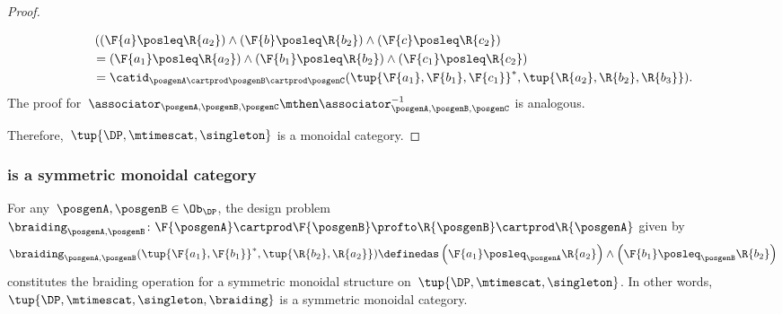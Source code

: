 \begin{proof}
\begin{compactitem}
\begin{equation}
\begin{aligned}
                & \left((\F{a}\posleq \R{a_2})\wedge (\F{b}\posleq \R{b_2}) \wedge (\F{c}\posleq \R{c_2}\right)\\
                &=(\F{a_1}\posleq \R{a_2}) \wedge (\F{b_1}\posleq \R{b_2}) \wedge (\F{c_1}\posleq \R{c_2})\\
                &=\catid_{\posgenA\cartprod \posgenB\cartprod \posgenC}(\tup{\F{a_1},\F{b_1},\F{c_1}}^*,\tup{\R{a_2},\R{b_2},\R{b_3}}).
            \end{aligned}
        \end{equation}
        The proof for~$\associator_{\posgenA,\posgenB,\posgenC}\mthen \associator_{\posgenA,\posgenB,\posgenC}^{-1}$ is analogous.
    \end{compactitem}
    Therefore,~$\tup{\DP,\mtimescat, \singleton}$ is a monoidal category.
\end{proof}

\subsubsection*{\DP is a symmetric monoidal category}
\begin{lemma}
    \label{lem:symmetricmonoidaldp}
    For any~$\posgenA,\posgenB \in\Ob_\DP$, the design problem~$\braiding_{\posgenA,\posgenB}\colon \F{\posgenA} \cartprod \F{\posgenB} \profto \R{\posgenB} \cartprod \R{\posgenA}$ given by
    \begin{equation}
        \braiding_{\posgenA,\posgenB}(\tup{\F{a_1},\F{b_1}}^*,\tup{\R{b_2},\R{a_2}})\definedas \left(\F{a_1}\posleq_\posgenA \R{a_2}\right)\wedge \left(\F{b_1}\posleq_\posgenB \R{b_2}\right)
    \end{equation}
    constitutes the braiding operation for a symmetric monoidal structure on~$\tup{\DP,\mtimescat,\singleton}$.
    In other words,~$\tup{\DP, \mtimescat, \singleton, \braiding}$ is a symmetric monoidal category.
\end{lemma}

